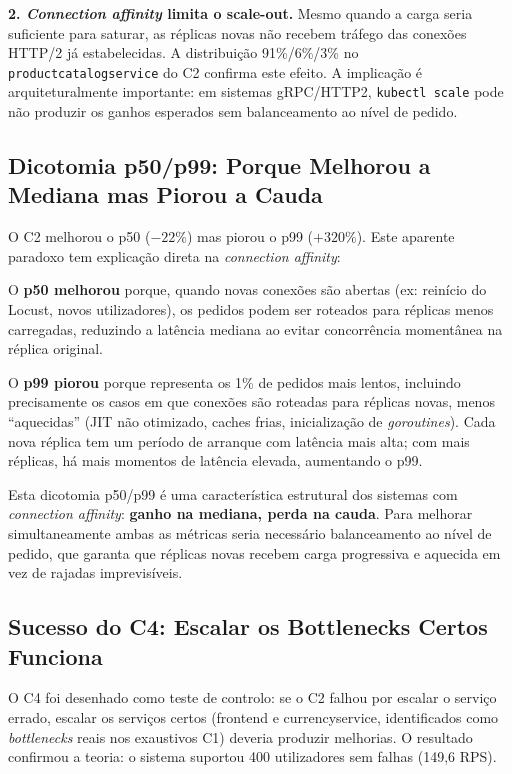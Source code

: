 \documentclass[manuscript,oneside]{acmart}
\begin{document}
\textbf{2. \textit{Connection affinity} limita o scale-out.} Mesmo quando a carga seria suficiente para saturar, as réplicas novas não recebem tráfego das conexões HTTP/2 já estabelecidas. A distribuição 91\%/6\%/3\% no \texttt{productcatalogservice} do C2 confirma este efeito. A implicação é arquiteturalmente importante: em sistemas gRPC/HTTP2, \texttt{kubectl scale} pode não produzir os ganhos esperados sem balanceamento ao nível de pedido.

\subsection{Dicotomia p50/p99: Porque Melhorou a Mediana mas Piorou a Cauda}

O C2 melhorou o p50 ($-22\%$) mas piorou o p99 ($+320\%$). Este aparente paradoxo tem explicação direta na \textit{connection affinity}:

O \textbf{p50 melhorou} porque, quando novas conexões são abertas (ex: reinício do Locust, novos utilizadores), os pedidos podem ser roteados para réplicas menos carregadas, reduzindo a latência mediana ao evitar concorrência momentânea na réplica original.

O \textbf{p99 piorou} porque representa os 1\% de pedidos mais lentos, incluindo precisamente os casos em que conexões são roteadas para réplicas novas, menos ``aquecidas'' (JIT não otimizado, caches frias, inicialização de \textit{goroutines}). Cada nova réplica tem um período de arranque com latência mais alta; com mais réplicas, há mais momentos de latência elevada, aumentando o p99.

Esta dicotomia p50/p99 é uma característica estrutural dos sistemas com \textit{connection affinity}: \textbf{ganho na mediana, perda na cauda}. Para melhorar simultaneamente ambas as métricas seria necessário balanceamento ao nível de pedido, que garanta que réplicas novas recebem carga progressiva e aquecida em vez de rajadas imprevisíveis.

\subsection{Sucesso do C4: Escalar os Bottlenecks Certos Funciona}

O C4 foi desenhado como teste de controlo: se o C2 falhou por escalar o serviço errado, escalar os serviços certos (frontend e currencyservice, identificados como \textit{bottlenecks} reais nos exaustivos C1) deveria produzir melhorias. O resultado confirmou a teoria: o sistema suportou 400 utilizadores sem falhas (149,6 RPS).
\end{document}
